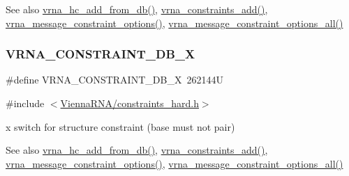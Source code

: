 \begin{DoxySeeAlso}{See also}
\mbox{\hyperlink{group__hard__constraints_ga5b4de3247b67358080c176b94591a8e6}{vrna\+\_\+hc\+\_\+add\+\_\+from\+\_\+db()}}, \mbox{\hyperlink{group__constraints_ga35a401f680969a556858a8dd5f1d07cc}{vrna\+\_\+constraints\+\_\+add()}}, \mbox{\hyperlink{group__constraints_gaa1f20b53bf09ac2e6b0dbb13f7d89670}{vrna\+\_\+message\+\_\+constraint\+\_\+options()}}, \mbox{\hyperlink{group__constraints_gaec7e13fa0465c2acc7a621d1aecb709f}{vrna\+\_\+message\+\_\+constraint\+\_\+options\+\_\+all()}} 
\end{DoxySeeAlso}
\mbox{\label{group__hard__constraints_ga7283bbe0f8954f7b030ecc3f2d1932b2}} 
\subsubsection{\texorpdfstring{V\+R\+N\+A\+\_\+\+C\+O\+N\+S\+T\+R\+A\+I\+N\+T\+\_\+\+D\+B\+\_\+X}{VRNA\_CONSTRAINT\_DB\_X}}
{\footnotesize\ttfamily \#define V\+R\+N\+A\+\_\+\+C\+O\+N\+S\+T\+R\+A\+I\+N\+T\+\_\+\+D\+B\+\_\+X~262144U}



{\ttfamily \#include $<$\mbox{\hyperlink{constraints__hard_8h}{Vienna\+R\+N\+A/constraints\+\_\+hard.\+h}}$>$}



\textquotesingle{}x\textquotesingle{} switch for structure constraint (base must not pair) 

\begin{DoxySeeAlso}{See also}
\mbox{\hyperlink{group__hard__constraints_ga5b4de3247b67358080c176b94591a8e6}{vrna\+\_\+hc\+\_\+add\+\_\+from\+\_\+db()}}, \mbox{\hyperlink{group__constraints_ga35a401f680969a556858a8dd5f1d07cc}{vrna\+\_\+constraints\+\_\+add()}}, \mbox{\hyperlink{group__constraints_gaa1f20b53bf09ac2e6b0dbb13f7d89670}{vrna\+\_\+message\+\_\+constraint\+\_\+options()}}, \mbox{\hyperlink{group__constraints_gaec7e13fa0465c2acc7a621d1aecb709f}{vrna\+\_\+message\+\_\+constraint\+\_\+options\+\_\+all()}} 
\end{DoxySeeAlso}
\mbox{\label{group__hard__constraints_gac17b034852c914bc5879954c65d7e74b}} 
